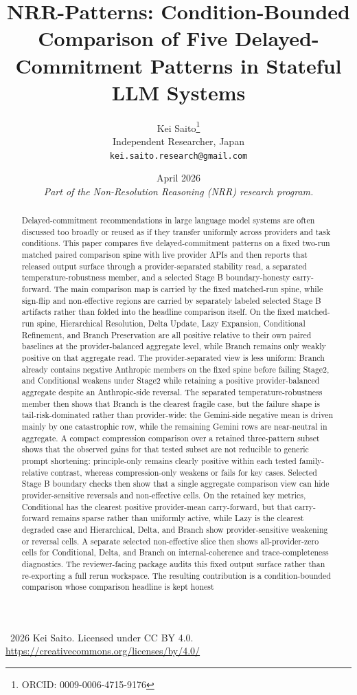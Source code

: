 \documentclass[11pt,a4paper]{article}
\title{\textbf{NRR-Patterns: Condition-Bounded Comparison of Five Delayed-Commitment Patterns in Stateful LLM Systems}}
\author{
  Kei Saito\thanks{ORCID: 0009-0006-4715-9176} \\
  Independent Researcher, Japan \\
  \texttt{kei.saito.research@gmail.com}
}
\date{April 2026 \\[0.5em]
\textit{Part of the Non-Resolution Reasoning (NRR) research program.}}
\begin{document}
\maketitle

\begin{center}
\textcopyright\ 2026 Kei Saito.
Licensed under CC BY 4.0.\\
\url{https://creativecommons.org/licenses/by/4.0/}
\end{center}

\begin{abstract}
Delayed-commitment recommendations in large language model systems are often discussed too broadly or reused as if they transfer uniformly across providers and task conditions. This paper compares five delayed-commitment patterns on a fixed two-run matched paired comparison spine with live provider APIs and then reports that released output surface through a provider-separated stability read, a separated temperature-robustness member, and a selected Stage B boundary-honesty carry-forward. The main comparison map is carried by the fixed matched-run spine, while sign-flip and non-effective regions are carried by separately labeled selected Stage B artifacts rather than folded into the headline comparison itself. On the fixed matched-run spine, Hierarchical Resolution, Delta Update, Lazy Expansion, Conditional Refinement, and Branch Preservation are all positive relative to their own paired baselines at the provider-balanced aggregate level, while Branch remains only weakly positive on that aggregate read. The provider-separated view is less uniform: Branch already contains negative Anthropic members on the fixed spine before failing Stage2, and Conditional weakens under Stage2 while retaining a positive provider-balanced aggregate despite an Anthropic-side reversal. The separated temperature-robustness member then shows that Branch is the clearest fragile case, but the failure shape is tail-risk-dominated rather than provider-wide: the Gemini-side negative mean is driven mainly by one catastrophic row, while the remaining Gemini rows are near-neutral in aggregate. A compact compression comparison over a retained three-pattern subset shows that the observed gains for that tested subset are not reducible to generic prompt shortening: principle-only remains clearly positive within each tested family-relative contrast, whereas compression-only weakens or fails for key cases. Selected Stage B boundary checks then show that a single aggregate comparison view can hide provider-sensitive reversals and non-effective cells. On the retained key metrics, Conditional has the clearest positive provider-mean carry-forward, but that carry-forward remains sparse rather than uniformly active, while Lazy is the clearest degraded case and Hierarchical, Delta, and Branch show provider-sensitive weakening or reversal cells. A separate selected non-effective slice then shows all-provider-zero cells for Conditional, Delta, and Branch on internal-coherence and trace-completeness diagnostics. The reviewer-facing package audits this fixed output surface rather than re-exporting a full rerun workspace. The resulting contribution is a condition-bounded comparison whose comparison headline is kept honest 
\end{abstract}
\end{document}
